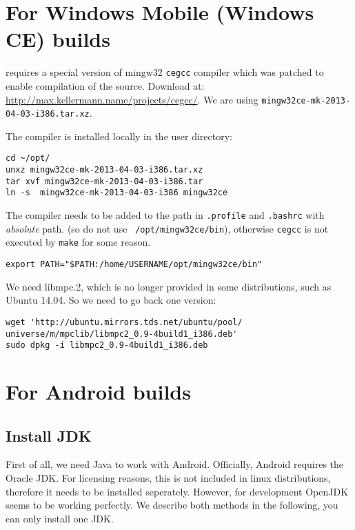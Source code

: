 \section{For Windows Mobile (Windows CE) builds}

\xc requires a special version of mingw32 \texttt{cegcc} compiler which was patched to enable compilation of the source. Download at: \href{http://max.kellermann.name/projects/cegcc/}{http://max.kellermann.name/projects/cegcc/}. We are using \texttt{mingw32ce-mk-2013-04-03-i386.tar.xz}.

The compiler is installed locally in the user directory:

\begin{verbatim}
cd ~/opt/
unxz mingw32ce-mk-2013-04-03-i386.tar.xz 
tar xvf mingw32ce-mk-2013-04-03-i386.tar
ln -s  mingw32ce-mk-2013-04-03-i386 mingw32ce
\end{verbatim}

The compiler needs to be added to the path in \texttt{.profile} and \texttt{.bashrc} with \emph{absolute} path. (so do not use \texttt{~/opt/mingw32ce/bin}), otherwise \texttt{cegcc} is not executed by \texttt{make} for some reason.

\begin{verbatim}
export PATH="$PATH:/home/USERNAME/opt/mingw32ce/bin"
\end{verbatim}

We need  libmpc.2, which is no longer provided in some distributions, such as Ubuntu 14.04. So we need to go back one version:


\hspace{-3cm}\begin{verbatim}
wget 'http://ubuntu.mirrors.tds.net/ubuntu/pool/
universe/m/mpclib/libmpc2_0.9-4build1_i386.deb'
sudo dpkg -i libmpc2_0.9-4build1_i386.deb
\end{verbatim}


\section{For Android  builds}
\subsection{Install JDK}
First of all, we need Java to work with Android. Officially, Android requires the Oracle JDK. For licensing reasons, this is not included in linux distributions, therefore it needs to be installed seperately.  However, for \xc development OpenJDK seems to be working perfectly. We describe both methods in the following, you can only install one JDK.

